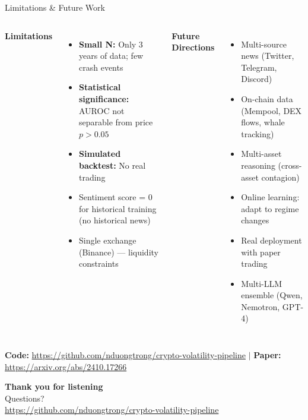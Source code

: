 \documentclass[10pt,aspectratio=169]{beamer}
\begin{document}
\begin{frame}{Limitations \& Future Work}
  \begin{columns}[t]
    \textbf{Limitations}
    \begin{itemize}
      \item \textbf{Small N:} Only 3 years of data; few crash events
      \item \textbf{Statistical significance:} AUROC not separable from price $p > 0.05$
      \item \textbf{Simulated backtest:} No real trading
      \item Sentiment score = 0 for historical training (no historical news)
      \item Single exchange (Binance) — liquidity constraints
    \end{itemize}
    
    \textbf{Future Directions}
    \begin{itemize}
      \item Multi-source news (Twitter, Telegram, Discord)
      \item On-chain data (Mempool, DEX flows, whale tracking)
      \item Multi-asset reasoning (cross-asset contagion)
      \item Online learning: adapt to regime changes
      \item Real deployment with paper trading
      \item Multi-LLM ensemble (Qwen, Nemotron, GPT-4)
    \end{itemize}
  \end{columns}
  
  \vspace{0.3cm}
  \centering
  \textbf{Code:} \url{https://github.com/nduongtrong/crypto-volatility-pipeline} \quad $|$ \quad \textbf{Paper:} \url{https://arxiv.org/abs/2410.17266}
\end{frame}

\begin{frame}[standout]
  \centering
  \Huge \textbf{Thank you for listening } \\[1em]
  \Large Questions? \\[0.5em]
  \normalsize \url{https://github.com/nduongtrong/crypto-volatility-pipeline}
\end{frame}
\end{document}
